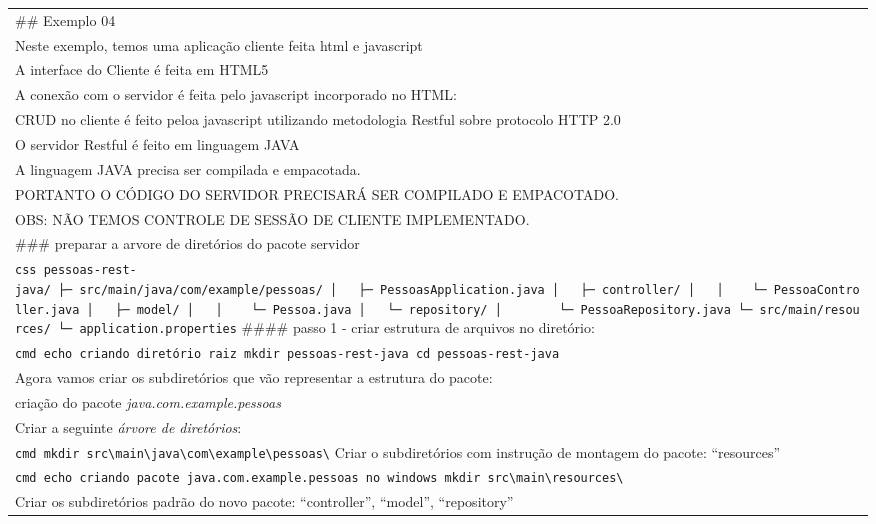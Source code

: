 \documentclass[
]{book}
\begin{document}
\begin{longtable}[]{@{}
  >{\raggedright\arraybackslash}p{}@{}}
\toprule\noalign{}
\endhead
\bottomrule\noalign{}
\endlastfoot
\#\# Exemplo 04 \\
Neste exemplo, temos uma aplicação cliente feita html e javascript \\
A interface do Cliente é feita em HTML5 \\
A conexão com o servidor é feita pelo javascript incorporado no HTML: \\
CRUD no cliente é feito peloa javascript utilizando metodologia Restful sobre protocolo HTTP 2.0 \\
O servidor Restful é feito em linguagem JAVA \\
A linguagem JAVA precisa ser compilada e empacotada. \\
PORTANTO O CÓDIGO DO SERVIDOR PRECISARÁ SER COMPILADO E EMPACOTADO. \\
OBS: NÃO TEMOS CONTROLE DE SESSÃO DE CLIENTE IMPLEMENTADO. \\
\#\#\# preparar a arvore de diretórios do pacote servidor \\
\texttt{css\ pessoas-rest-java/\ ├─\ src/main/java/com/example/pessoas/\ │\ \ \ ├─\ PessoasApplication.java\ │\ \ \ ├─\ controller/\ │\ \ \ │\ \ \ \ └─\ PessoaController.java\ │\ \ \ ├─\ model/\ │\ \ \ │\ \ \ \ └─\ Pessoa.java\ │\ \ \ └─\ repository/\ │\ \ \ \ \ \ \ \ └─\ PessoaRepository.java\ └─\ src/main/resources/\ └─\ application.properties}
\#\#\#\# passo 1 - criar estrutura de arquivos no diretório: \\
\texttt{cmd\ echo\ criando\ diretório\ raiz\ mkdir\ pessoas-rest-java\ cd\ pessoas-rest-java} \\
Agora vamos criar os subdiretórios que vão representar a estrutura do pacote: \\
criação do pacote \emph{java.com.example.pessoas} \\
Criar a seguinte \emph{árvore de diretórios}: \\
\texttt{cmd\ mkdir\ src\textbackslash{}main\textbackslash{}java\textbackslash{}com\textbackslash{}example\textbackslash{}pessoas\textbackslash{}}
Criar o subdiretórios com instrução de montagem do pacote: ``resources'' \\
\texttt{cmd\ echo\ criando\ pacote\ java.com.example.pessoas\ no\ windows\ mkdir\ src\textbackslash{}main\textbackslash{}resources\textbackslash{}} \\
Criar os subdiretórios padrão do novo pacote: ``controller'', ``model'', ``repository'' \\

\end{longtable}
\end{document}
